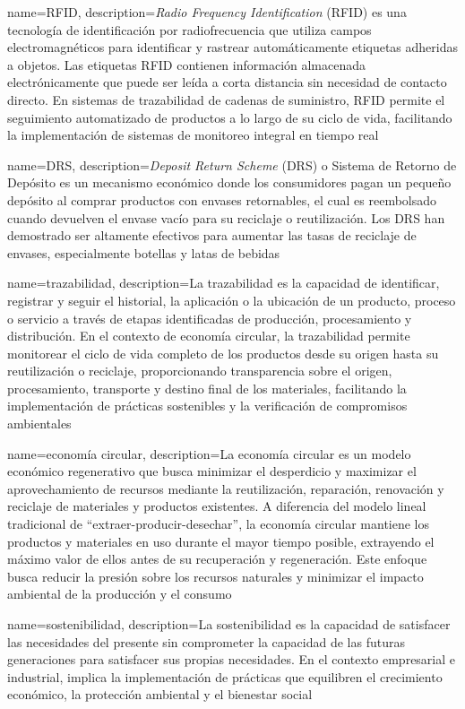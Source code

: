 {
    name=RFID,
    description={\textit{Radio Frequency Identification} (RFID) es una tecnología de identificación por radiofrecuencia que utiliza campos electromagnéticos para identificar y rastrear automáticamente etiquetas adheridas a objetos. Las etiquetas RFID contienen información almacenada electrónicamente que puede ser leída a corta distancia sin necesidad de contacto directo. En sistemas de trazabilidad de cadenas de suministro, RFID permite el seguimiento automatizado de productos a lo largo de su ciclo de vida, facilitando la implementación de sistemas de monitoreo integral en tiempo real}
}

{
    name=DRS,
    description={\textit{Deposit Return Scheme} (DRS) o Sistema de Retorno de Depósito es un mecanismo económico donde los consumidores pagan un pequeño depósito al comprar productos con envases retornables, el cual es reembolsado cuando devuelven el envase vacío para su reciclaje o reutilización. Los DRS han demostrado ser altamente efectivos para aumentar las tasas de reciclaje de envases, especialmente botellas y latas de bebidas}
}

{
    name=trazabilidad,
    description={La trazabilidad es la capacidad de identificar, registrar y seguir el historial, la aplicación o la ubicación de un producto, proceso o servicio a través de etapas identificadas de producción, procesamiento y distribución. En el contexto de economía circular, la trazabilidad permite monitorear el ciclo de vida completo de los productos desde su origen hasta su reutilización o reciclaje, proporcionando transparencia sobre el origen, procesamiento, transporte y destino final de los materiales, facilitando la implementación de prácticas sostenibles y la verificación de compromisos ambientales}
}

{
    name=economía circular,
    description={La economía circular es un modelo económico regenerativo que busca minimizar el desperdicio y maximizar el aprovechamiento de recursos mediante la reutilización, reparación, renovación y reciclaje de materiales y productos existentes. A diferencia del modelo lineal tradicional de ``extraer-producir-desechar'', la economía circular mantiene los productos y materiales en uso durante el mayor tiempo posible, extrayendo el máximo valor de ellos antes de su recuperación y regeneración. Este enfoque busca reducir la presión sobre los recursos naturales y minimizar el impacto ambiental de la producción y el consumo \cite{cerda2016economia}}
}

{
    name=sostenibilidad,
    description={La sostenibilidad es la capacidad de satisfacer las necesidades del presente sin comprometer la capacidad de las futuras generaciones para satisfacer sus propias necesidades. En el contexto empresarial e industrial, implica la implementación de prácticas que equilibren el crecimiento económico, la protección ambiental y el bienestar social}
}
